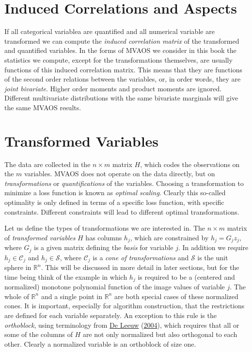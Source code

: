 \documentclass[
  12pt,
]{book}
\begin{document}
\hypertarget{induced-correlations-and-aspects}{%
\section{Induced Correlations and Aspects}\label{induced-correlations-and-aspects}}

If all categorical variablea are quantified and all numerical variable are transformed we can compute the \emph{induced correlation matrix} of the transformed and quantified variables. In the forms of MVAOS we consider in this book the statistics we compute, except for the transformations themselves, are usually functions of this induced correlation matrix. This means that they are functions of the second order relations between the variables, or, in order words, they are \emph{joint bivariate}. Higher order moments and product moments are ignored. Different multivariate distributions with the same bivariate marginals will give the same MVAOS results.

\hypertarget{transformed-variables}{%
\section{Transformed Variables}\label{transformed-variables}}

The data are collected in the \(n\times m\) matrix \(H\), which codes the observations on the \(m\) variables. MVAOS does not operate on the data directly, but on \emph{transformations} or \emph{quantifications} of the variables. Choosing a transformation to minimize a loss function is known as \emph{optimal scaling}. Clearly this so-called optimality is only defined in terms of a specific loss function, with specific constraints. Different constraints will lead to different optimal transformations.

Let us define the types of transformations we are interested in. The \(n\times m\) matrix of \emph{transformed variables} \(H\) has columns \(h_j\), which are constrained by \(h_j=G_jz_j\), where \(G_j\) is a given matrix defining the \emph{basis} for variable \(j\). In addition we require \(h_j\in\mathcal{C}_j\) and \(h_j\in\mathcal{S}\), where \(\mathcal{C}_j\) is a \emph{cone of transformations} and \(\mathcal{S}\) is the unit sphere in \(\mathbb{R}^n\). This will be discussed in more detail in later sections, but for the time being think of the example in which \(h_j\) is required to be a (centered and normalized) monotone polynomial function of the image values of variable \(j\). The whole of \(\mathbb{R}^n\) and a single point in \(\mathbb{R}^n\) are both special cases of these normalized cones. It is important, especially for algorithm construction, that the restrictions are defined for each variable separately. An exception to this rule is the \emph{orthoblock}, using terminology from \protect\hyperlink{ref-deleeuw_C_04a}{De Leeuw} (\protect\hyperlink{ref-deleeuw_C_04a}{2004}), which requires that all or some of the columns of \(H\) are not only normalized but also orthogonal to each other. Clearly a normalized variable is an orthoblock of size one.
\end{document}
